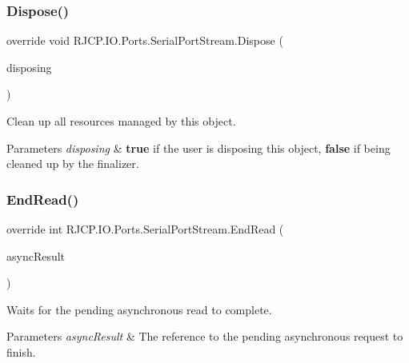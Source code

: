 \subsubsection{\texorpdfstring{Dispose()}{Dispose()}}
{\footnotesize\ttfamily override void R\+J\+C\+P.\+I\+O.\+Ports.\+Serial\+Port\+Stream.\+Dispose (\begin{DoxyParamCaption}\item[{bool}]{disposing }\end{DoxyParamCaption})\hspace{0.3cm}{\ttfamily [protected]}}



Clean up all resources managed by this object. 


\begin{DoxyParams}{Parameters}
{\em disposing} & {\bfseries{true}} if the user is disposing this object, {\bfseries{false}} if being cleaned up by the finalizer.\\
\hline
\end{DoxyParams}
\mbox{\label{class_r_j_c_p_1_1_i_o_1_1_ports_1_1_serial_port_stream_a91130f485bc8584398e7d36377a126be}} 
\subsubsection{\texorpdfstring{EndRead()}{EndRead()}}
{\footnotesize\ttfamily override int R\+J\+C\+P.\+I\+O.\+Ports.\+Serial\+Port\+Stream.\+End\+Read (\begin{DoxyParamCaption}\item[{I\+Async\+Result}]{async\+Result }\end{DoxyParamCaption})}



Waits for the pending asynchronous read to complete. 


\begin{DoxyParams}{Parameters}
{\em async\+Result} & The reference to the pending asynchronous request to finish.\\
\hline
\end{DoxyParams}

